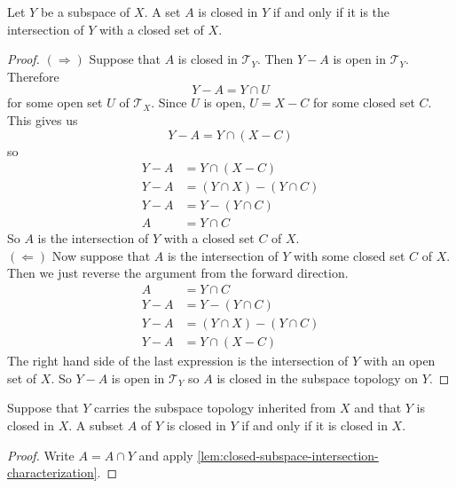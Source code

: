 \begin{lemma}\label{lem:closed-subspace-intersection-characterization}
    Let \( Y \) be a subspace of \( X \). A set \( A \) is closed in \( Y \) if and only if it is the intersection of \( Y \) with a closed set of \( X \).
\end{lemma}
\begin{proof}
    \( \left( \Rightarrow \right) \) Suppose that \( A \) is closed in \( \mathscr{T}_{Y} \). Then \( Y-A \) is open in \( \mathscr{T}_{Y} \). Therefore \[ Y-A= Y \cap U \] for some open set \( U \) of \( \mathscr{T}_{X} \). Since \( U \) is open, \( U = X-C \) for some closed set \( C \). This gives us
    \[ Y-A= Y \cap \left( X-C \right) \]
    so 
    \begin{align*}
        Y-A &= Y \cap \left( X-C \right) \\
        Y-A &= \left(  Y \cap X \right) - \left( Y \cap C \right) \\
        Y- A &= Y - \left( Y \cap C \right) \tag*{Since $Y \subset X$.}\\
        A &= Y \cap C
    \end{align*}
    So \( A \) is the intersection of \( Y \) with a closed set \( C \) of \( X \). \\ 
    \( \left( \Leftarrow \right) \) Now suppose that \( A \) is the intersection of \( Y \) with some closed set \( C \) of \( X \). Then we just reverse the argument from the forward direction. 
    \begin{align*}
        A &= Y \cap C \\
        Y- A &= Y - \left( Y \cap C \right) \\
        Y-A &= \left(  Y \cap X \right) - \left( Y \cap C \right) \tag*{Since $Y \subset X$.} \\
        Y-A &= Y \cap \left( X-C \right)
    \end{align*}
    The right hand side of the last expression is the intersection of \( Y \) with an open set of \( X \). So \( Y-A \) is open in \( \mathscr{T}_{Y} \) so \( A \) is closed in the subspace topology on \( Y \).
\end{proof}

\begin{corollary}
    Suppose that \( Y \) carries the subspace topology inherited from \( X \) and that \( Y \) is closed in \( X \). A subset \( A \) of \( Y \) is closed in \( Y \) if and only if it is closed in \( X \). 
\end{corollary}
\begin{proof}
    Write \( A = A \cap Y \) and apply \cref{lem:closed-subspace-intersection-characterization}.
\end{proof}
